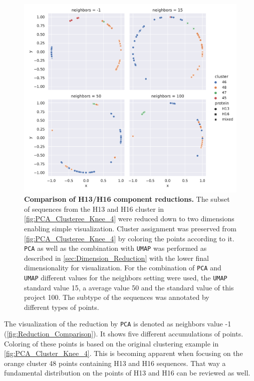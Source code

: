 \begin{figure}[!hbt]
    \centering
    \includegraphics[width=\textwidth]{PCA/Difference_Segment_4_H_metric_cosine.pdf}
    \caption[Comparison of H13/H16 component reductions]{\textbf{Comparison of H13/H16 component reductions.} The subset of sequences from the H13 and H16 cluster in \autoref{fig:PCA_Clusteree_Knee_4} were reduced down to two dimensions enabling simple visualization. Cluster assignment was preserved from \autoref{fig:PCA_Clusteree_Knee_4} by coloring the points according to it. \texttt{PCA} as well as the combination with \texttt{UMAP} was performed as described in \autoref{sec:Dimension_Reduction} with the lower final dimensionality for visualization. For the combination of \texttt{PCA} and \texttt{UMAP} different values for the neighbors setting were used, the \texttt{UMAP} standard value 15, a average value 50 and the standard value of this project 100. The subtype of the sequences was annotated by different types of points.}
    \label{fig:Reduction_Comparison}
\end{figure}

The visualization of the reduction by \texttt{PCA} is denoted as neighbors value -1 (\autoref{fig:Reduction_Comparison}). It shows five different accumulations of points. Coloring of these points is based on the original clustering example in \autoref{fig:PCA_Cluster_Knee_4}. This is becoming apparent when focusing on the orange cluster 48 points containing H13 and H16 sequences. That way a fundamental distribution on the points of H13 and H16 can be reviewed as well. 

